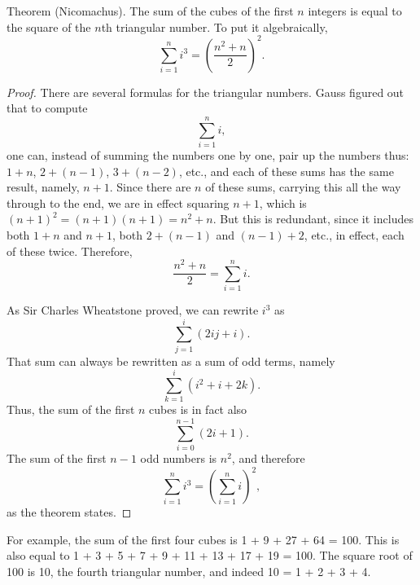 \documentclass[12pt]{article}
\begin{document}
Theorem (Nicomachus). The sum of the cubes of the first $n$ integers is equal to the square of the $n$th triangular number. To put it algebraically, $$\sum_{i = 1}^n i^3 = \left( \frac{n^2 + n}{2} \right)^2.$$

\begin{proof} There are several formulas for the triangular numbers. Gauss figured out that to compute $$\sum_{i = 1}^n i,$$ one can, instead of summing the numbers one by one, pair up the numbers thus: $1 + n$, $2 + (n - 1)$, $3 + (n - 2)$, etc., and each of these sums has the same result, namely, $n + 1$. Since there are $n$ of these sums, carrying this all the way through to the end, we are in effect squaring $n + 1$, which is $(n + 1)^2 = (n + 1)(n + 1) = n^2 + n$. But this is redundant, since it includes both $1 + n$ and $n + 1$, both $2 + (n - 1)$ and $(n - 1) + 2$, etc., in effect, each of these twice. Therefore, $$\frac{n^2 + n}{2} = \sum_{i = 1}^n i.$$

As Sir Charles Wheatstone proved, we can rewrite $i^3$ as $$\sum_{j = 1}^i (2ij + i).$$ That sum can always be rewritten as a sum of odd terms, namely $$\sum_{k = 1}^i (i^2 + i + 2k).$$ Thus, the sum of the first $n$ cubes is in fact also $$\sum_{i = 0}^{n - 1} (2i + 1).$$ The sum of the first $n - 1$ odd numbers is $n^2$, and therefore $$\sum_{i = 1}^n i^3 = \left( \sum_{i = 1}^n i \right)^2,$$ as the theorem states.
\end{proof}

For example, the sum of the first four cubes is 1 + 9 + 27 + 64 = 100. This is also equal to 1 + 3 + 5 + 7 + 9 + 11 + 13 + 17 + 19 = 100. The square root of 100 is 10, the fourth triangular number, and indeed 10 = 1 + 2 + 3 + 4.
\end{document}

